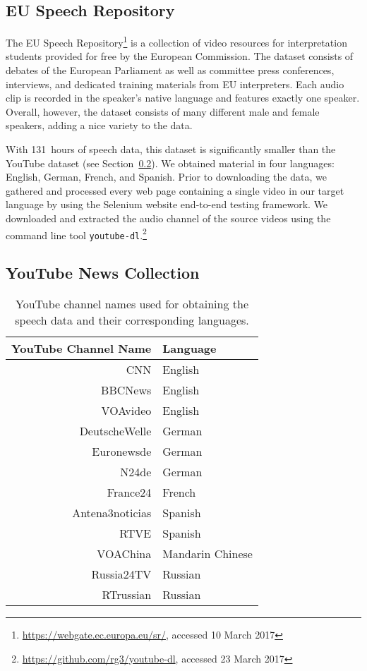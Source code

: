 \subsection{EU Speech Repository}

	The EU Speech Repository\footnote{\url{https://webgate.ec.europa.eu/sr/}, accessed 10 March 2017} is a collection of video resources for interpretation students provided for free by the European Commission. The dataset consists of debates of the European Parliament as well as committee press conferences, interviews, and dedicated training materials from EU interpreters. Each audio clip is recorded in the speaker's native language and features exactly one speaker. Overall, however, the dataset consists of many different male and female speakers, adding a nice variety to the data.

		With \num{131}~hours of speech data, this dataset is significantly smaller than the YouTube dataset (see Section~\ref{sec:youtube_news}). We obtained material in four languages: English, German, French, and Spanish. Prior to downloading the data, we gathered and processed every web page containing a single video in our target language by using the Selenium website end-to-end testing framework. We downloaded and extracted the audio channel of the source videos using the command line tool \texttt{youtube-dl}.\footnote{\url{https://github.com/rg3/youtube-dl}, accessed 23 March 2017}

\subsection{YouTube News Collection}
\label{sec:youtube_news}
%
	\begin{table}[tp]
	\centering
	\begin{tabu}{rl}
	\toprule
	\textbf{YouTube Channel Name}  & \textbf{Language} \\ \midrule
	CNN                   & English \\
	BBCNews               & English \\
	VOAvideo              & English \\
	DeutscheWelle         & German \\
	Euronewsde            & German \\
	N24de                 & German \\
	France24              & French \\
	Antena3noticias       & Spanish \\
	RTVE                  & Spanish \\
	VOAChina              & Mandarin Chinese  \\
	Russia24TV            & Russian \\
	RTrussian             & Russian \\ \bottomrule
	\end{tabu}
	\caption{YouTube channel names used for obtaining the speech data and their corresponding languages.}
	\label{tab:channels}
	\end{table}
%

